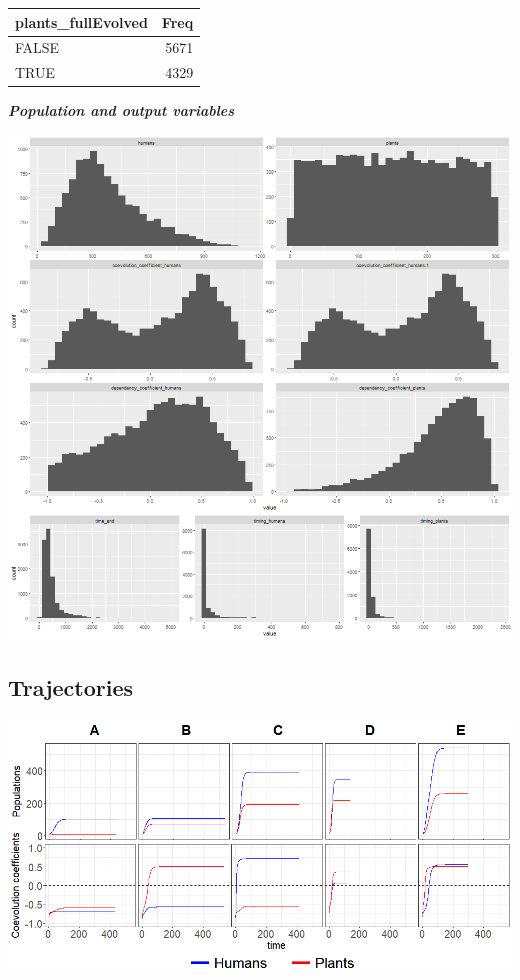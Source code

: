 \documentclass[
]{book}
\begin{document}
\begin{tabular}{l|r}
\hline
plants\_fullEvolved & Freq\\
\hline
FALSE & 5671\\
\hline
TRUE & 4329\\
\hline
\end{tabular}

\textbf{\emph{Population and output variables}}

\includegraphics[width=1\linewidth]{plots/5_LHS_summary_plot}

\hypertarget{trajectories}{%
\subsection{Trajectories}\label{trajectories}}

\includegraphics[width=1\linewidth]{plots/5_LHS_trajectoriesOverview}
\end{document}
